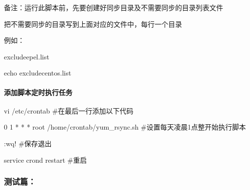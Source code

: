\documentclass[letterpaper,10pt,english]{sphinxmanual}
\begin{document}
备注：运行此脚本前，先要创建好同步目录及不需要同步的目录列表文件

%
\begin{sphinxVerbatim}[commandchars=\\\{\}]
   

    

    

    
\end{sphinxVerbatim}

把不需要同步的目录写到上面对应的文件中，每行一个目录

例如：

%
\begin{sphinxVerbatim}[commandchars=\\\{\}]
 
\PYGZgt{}exclude\PYGZus{}epel.list
\end{sphinxVerbatim}

%
\begin{sphinxVerbatim}[commandchars=\\\{\}]
echo
\PYGZgt{}exclude\PYGZus{}centos.list
\end{sphinxVerbatim}


\paragraph{添加脚本定时执行任务}
\label{\detokenize{software_manage/yum/yum_official_sync:id8}}
vi /etc/crontab  \#在最后一行添加以下代码

0 1 * * * root /home/crontab/yum\_rsync.sh \#设置每天凌晨1点整开始执行脚本

:wq! \#保存退出

service crond restart \#重启


\subsubsection{测试篇：}
\label{\detokenize{software_manage/yum/yum_official_sync:id9}}
\end{document}
